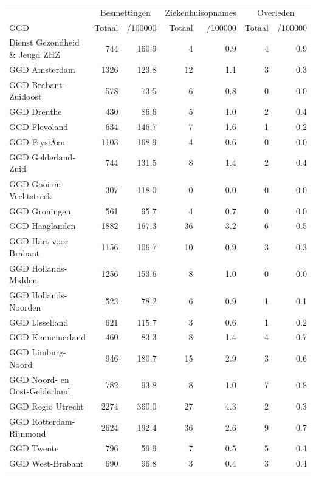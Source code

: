 \documentclass[
  english,
  man,floatsintext]{apa6}
\begin{document}
\begin{table}
\centering\begingroup\fontsize{10}{12}\selectfont

\begin{threeparttable}
\begin{tabular}{lrrrrrr}
\toprule
\multicolumn{1}{c}{ } & \multicolumn{2}{c}{Besmettingen} & \multicolumn{2}{c}{Ziekenhuisopnames} & \multicolumn{2}{c}{Overleden} \\
\cmidrule(l{3pt}r{3pt}){2-3} \cmidrule(l{3pt}r{3pt}){4-5} \cmidrule(l{3pt}r{3pt}){6-7}
GGD & Totaal & /100000 & Totaal & /100000 & Totaal & /100000\\
\midrule
Dienst Gezondheid \& Jeugd ZHZ & 744 & 160.9 & 4 & 0.9 & 4 & 0.9\\
GGD Amsterdam & 1326 & 123.8 & 12 & 1.1 & 3 & 0.3\\
GGD Brabant-Zuidoost & 578 & 73.5 & 6 & 0.8 & 0 & 0.0\\
GGD Drenthe & 430 & 86.6 & 5 & 1.0 & 2 & 0.4\\
GGD Flevoland & 634 & 146.7 & 7 & 1.6 & 1 & 0.2\\
GGD FryslÃ¢n & 1103 & 168.9 & 4 & 0.6 & 0 & 0.0\\
GGD Gelderland-Zuid & 744 & 131.5 & 8 & 1.4 & 2 & 0.4\\
GGD Gooi en Vechtstreek & 307 & 118.0 & 0 & 0.0 & 0 & 0.0\\
GGD Groningen & 561 & 95.7 & 4 & 0.7 & 0 & 0.0\\
GGD Haaglanden & 1882 & 167.3 & 36 & 3.2 & 6 & 0.5\\
GGD Hart voor Brabant & 1156 & 106.7 & 10 & 0.9 & 3 & 0.3\\
GGD Hollands-Midden & 1256 & 153.6 & 8 & 1.0 & 0 & 0.0\\
GGD Hollands-Noorden & 523 & 78.2 & 6 & 0.9 & 1 & 0.1\\
GGD IJsselland & 621 & 115.7 & 3 & 0.6 & 1 & 0.2\\
GGD Kennemerland & 460 & 83.3 & 8 & 1.4 & 4 & 0.7\\
GGD Limburg-Noord & 946 & 180.7 & 15 & 2.9 & 3 & 0.6\\
GGD Noord- en Oost-Gelderland & 782 & 93.8 & 8 & 1.0 & 7 & 0.8\\
GGD Regio Utrecht & 2274 & 360.0 & 27 & 4.3 & 2 & 0.3\\
GGD Rotterdam-Rijnmond & 2624 & 192.4 & 36 & 2.6 & 9 & 0.7\\
GGD Twente & 796 & 59.9 & 7 & 0.5 & 5 & 0.4\\
GGD West-Brabant & 690 & 96.8 & 3 & 0.4 & 3 & 0.4\\

\end{tabular}
\end{threeparttable}
\end{table}
\end{document}
